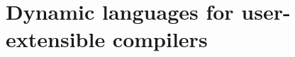






\section{Dynamic languages for user-extensible compilers}
\label{chap:dynamism-pattern-rewriting-motivating}

